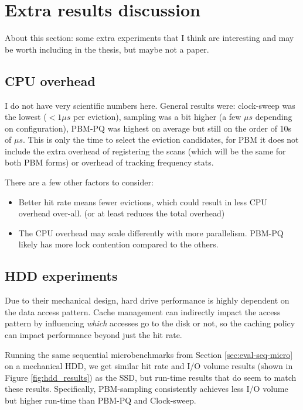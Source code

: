 

\chapter{Extra results discussion}
About this section: some extra experiments that I think are interesting and may be worth including in the thesis, but maybe not a paper.

\section{CPU overhead}
I do not have very scientific numbers here. General results were: clock-sweep was the lowest ($< 1\mu s$ per eviction), sampling was a bit higher (a few $\mu s$ depending on configuration), PBM-PQ was highest on average but still on the order of 10s of $\mu s$. This is only the time to select the eviction candidates, for PBM it does not include the extra overhead of registering the scans (which will be the same for both PBM forms) or overhead of tracking frequency stats.

There are a few other factors to consider:
\begin{itemize}
    \item Better hit rate means fewer evictions, which could result in less CPU overhead over-all. (or at least reduces the total overhead)
    \item The CPU overhead may scale differently with more parallelism. PBM-PQ likely has more lock contention compared to the others.
\end{itemize}

\section{HDD experiments}
Due to their mechanical design, hard drive performance is highly dependent on the data access pattern. Cache management can indirectly impact the access pattern by influencing \textit{which} accesses go to the disk or not, so the caching policy can impact performance beyond just the hit rate.

Running the same sequential microbenchmarks from Section \ref{sec:eval-seq-micro} on a mechanical HDD, we get similar hit rate and I/O volume results (shown in Figure \ref{fig:hdd_results}) as the SSD, but run-time results that do seem to match these results. Specifically, PBM-sampling consistently achieves less I/O volume but higher run-time than PBM-PQ and Clock-sweep.


